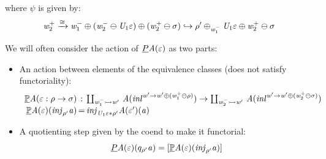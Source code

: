 where $\psi$ is given by: 
\[ \mathit{w}_2^+ \xrightarrow{\cong} \mathit{w}_1^- \oplus (\mathit{w}_2^- \ominus \mathit{U}_1\varepsilon) \oplus (\mathit{w}_2^+ \ominus \sigma)
           \hookrightarrow \rho' \oplus_{\mathit{w}_1^-} \mathit{U}_1\varepsilon \oplus \mathit{w}_2^+ \ominus \sigma
\]

We will often consider the action of $\underline{P}\mathit{A}(\varepsilon)$ as two parts: 
\begin{itemize}
    \item An action between elements of the equivalence classes (does not satisfy functoriality): 
        \[ \begin{array}{r@{\,}c@{\,}l}
            \dhideMonSk\vA(\varepsilon : \rho \to \sigma) & : & \Coprod{\vw_1^- \injto \vw'} \vA(\inl^{\vw' \to \vw' \oplus (\vw_1^+ \ominus \rho)}) \to
                                                                \Coprod{\vw_2^- \injto \vw'} \vA(\inl^{\vw' \to \vw' \oplus (\vw_2^+ \ominus \sigma)}) \\
            \dhideMonSk\vA(\varepsilon)(\inj{\rho'}\va) &  =  & \inj{\vU_1\varepsilon*\rho'}\vA(\varepsilon')(\va)
        \end{array}\]
    \item A quotienting step given by the coend to make it functorial: 
            \[ \underline{P}\mathit{A}(\varepsilon)(q_{\rho'}\mathit{a}) = [\underline{\mathbb{P}}\mathit{A}(\varepsilon)(\mathit{inj}_{\rho'}\mathit{a})] \]
\end{itemize}




